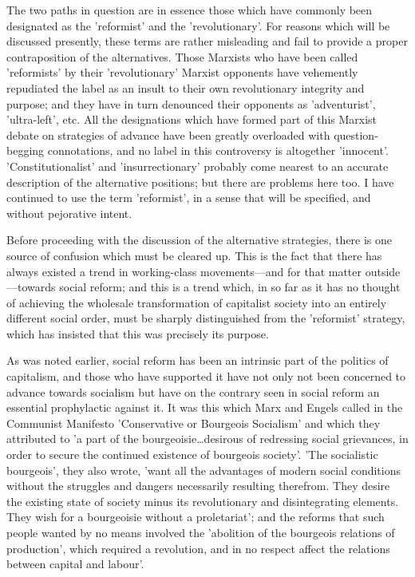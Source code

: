 The two paths in question are in essence those which have commonly been designated as the 'reformist' and the 'revolutionary'. For reasons which will be discussed presently, these terms are rather misleading and fail to provide a proper contraposition of the alternatives. Those Marxists who have been called 'reformists' by their 'revolutionary' Marxist opponents have vehemently repudiated the label as an insult to their own revolutionary integrity and purpose; and they have in turn denounced their opponents as 'adventurist', 'ultra-left', etc. All the designations which have formed part of this Marxist debate on strategies of advance have been greatly overloaded with question-begging connotations, and no label in this controversy is altogether 'innocent'. 'Constitutionalist' and 'insurrectionary' probably come nearest to an accurate description of the alternative positions; but there are problems here too. I have continued to use the term 'reformist', in a sense that will be specified, and without pejorative intent.

Before proceeding with the discussion of the alternative strategies, there is one source of confusion which must be cleared up. This is the fact that there has always existed a trend in working-class movements—and for that matter outside—towards social reform; and this is a trend which, in so far as it has no thought of achieving the wholesale transformation of capitalist society into an entirely different social order, must be sharply distinguished from the 'reformist' strategy, which has insisted that this was precisely its purpose.

As was noted earlier, social reform has been an intrinsic part of the politics of capitalism, and those who have supported it have not only not been concerned to advance towards socialism but have on the contrary seen in social reform an essential prophylactic against it. It was this which Marx and Engels called in the Communist Manifesto 'Conservative or Bourgeois Socialism' and which they attributed to 'a part of the bourgeoisie\dots desirous of redressing social grievances, in order to secure the continued existence of bourgeois society'. 'The socialistic bourgeois', they also wrote, 'want all the advantages of modern social conditions without the struggles and dangers necessarily resulting therefrom. They desire the existing state of society minus its revolutionary and disintegrating elements. They wish for a bourgeoisie without a proletariat'; and the reforms that such people wanted by no means involved the 'abolition of the bourgeois relations of production', which required a revolution, and in no respect affect the relations between capital and labour'.

